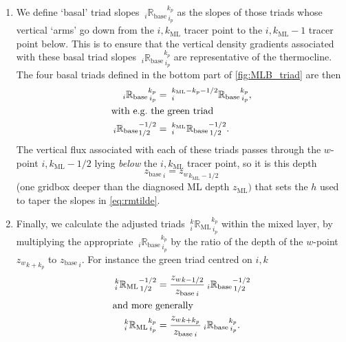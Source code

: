 \documentclass[../tex_main/NEMO_manual]{subfiles}
\begin{document}
\begin{enumerate}
\item We define `basal' triad slopes
${\:}_i{\mathbb{R}_{\mathrm{base}}}_{\,i_p}^{k_p}$ as the slopes
of those triads whose vertical `arms' go down from the
$i,k_{\mathrm{ML}}$ tracer point to the $i,k_{\mathrm{ML}}-1$ tracer point
below. This is to ensure that the vertical density gradients
associated with these basal triad slopes
${\:}_i{\mathbb{R}_{\mathrm{base}}}_{\,i_p}^{k_p}$ are
representative of the thermocline. The four basal triads defined in the bottom part
of \autoref{fig:MLB_triad} are then
\begin{align}
  {\:}_i{\mathbb{R}_{\mathrm{base}}}_{\,i_p}^{k_p} &=
 {\:}^{k_{\mathrm{ML}}-k_p-1/2}_i{\mathbb{R}_{\mathrm{base}}}_{\,i_p}^{k_p}, \label{eq:Rbase}
\\
\intertext{with e.g.\ the green triad}
{\:}_i{\mathbb{R}_{\mathrm{base}}}_{1/2}^{-1/2}&=
{\:}^{k_{\mathrm{ML}}}_i{\mathbb{R}_{\mathrm{base}}}_{\,1/2}^{-1/2}. \notag
\end{align}
The vertical flux associated with each of these triads passes through the $w$-point
$i,k_{\mathrm{ML}}-1/2$ lying \emph{below} the $i,k_{\mathrm{ML}}$ tracer point,
so it is this depth
\begin{equation}
  \label{eq:zbase}
  {z_\mathrm{base}}_{\,i}={z_{w}}_{k_\mathrm{ML}-1/2}
\end{equation}
(one gridbox deeper than the
diagnosed ML depth $z_{\mathrm{ML}})$ that sets the $h$ used to taper
the slopes in \autoref{eq:rmtilde}.
\item Finally, we calculate the adjusted triads
${\:}_i^k{\mathbb{R}_{\mathrm{ML}}}_{\,i_p}^{k_p}$ within the mixed
layer, by multiplying the appropriate
${\:}_i{\mathbb{R}_{\mathrm{base}}}_{\,i_p}^{k_p}$ by the ratio of
the depth of the $w$-point ${z_w}_{k+k_p}$ to ${z_{\mathrm{base}}}_{\,i}$. For
instance the green triad centred on $i,k$
\begin{align}
  {\:}_i^k{\mathbb{R}_{\mathrm{ML}}}_{\,1/2}^{-1/2} &=
\frac{{z_w}_{k-1/2}}{{z_{\mathrm{base}}}_{\,i}}{\:}_i{\mathbb{R}_{\mathrm{base}}}_{\,1/2}^{-1/2}
\notag \\
\intertext{and more generally}
 {\:}_i^k{\mathbb{R}_{\mathrm{ML}}}_{\,i_p}^{k_p} &=
\frac{{z_w}_{k+k_p}}{{z_{\mathrm{base}}}_{\,i}}{\:}_i{\mathbb{R}_{\mathrm{base}}}_{\,i_p}^{k_p}.\label{eq:RML}
\end{align}
\end{enumerate}
\end{document}

